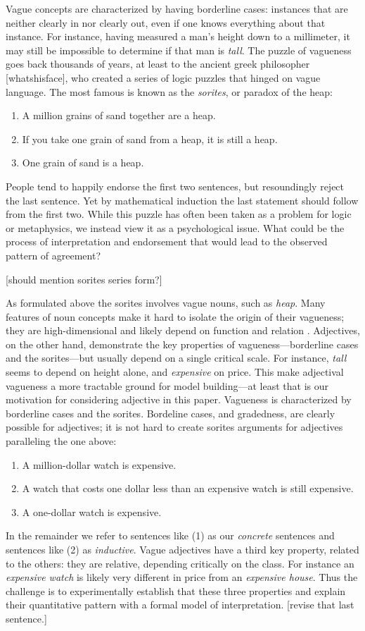 \documentclass[11pt]{amsart}
\newcommand{\ndg}[1]{{\color{ForestGreen}[#1]}}
\begin{document}
Vague concepts are characterized by having borderline cases: instances that are neither clearly in nor clearly out, even if one knows everything about that instance. 
For instance, having measured a man's height down to a millimeter, it may still be impossible to determine if that man is \emph{tall}.
The puzzle of vagueness goes back thousands of years, at least to the ancient greek philosopher \ndg{whatshisface}, who created a series of logic puzzles that hinged on vague language. 
The most famous is known as the \emph{sorites}, or paradox of the heap:
\begin{enumerate}
\item A million grains of sand together are a heap.
\item If you take one grain of sand from a heap, it is still a heap.
\item One grain of sand is a heap.
\end{enumerate}
People tend to happily endorse the first two sentences, but resoundingly reject the last sentence. Yet by mathematical induction the last statement should follow from the first two.
While this puzzle has often been taken as a problem for logic or metaphysics, we instead view it as a psychological issue. What could be the process of interpretation and endorsement that would lead to the observed pattern of agreement?

\ndg{should mention sorites series form?}

As formulated above the sorites involves vague nouns, such as \emph{heap}. 
Many features of noun concepts make it hard to isolate the origin of their vagueness; they are high-dimensional and likely depend on function and relation \cite{stuff}.
Adjectives, on the other hand, demonstrate the key properties of vagueness---borderline cases and the sorites---but usually depend on a single critical scale.
For instance, \emph{tall} seems to depend on height alone, and \emph{expensive} on price.
This make adjectival vagueness a more tractable ground for model building---at least that is our motivation for considering adjective in this paper.
Vagueness is characterized by borderline cases and the sorites.
Bordeline cases, and gradedness, are clearly possible for adjectives; it is not hard to create sorites arguments for adjectives paralleling the one above:
\begin{enumerate}
\item A million-dollar watch is expensive.
\item A watch that costs one dollar less than an expensive watch is still expensive.
\item A one-dollar watch is expensive.
\end{enumerate}
In the remainder we refer to sentences like (1) as our \emph{concrete} sentences and sentences like (2) as \emph{inductive}.
Vague adjectives have a third key property, related to the others: they are relative, depending critically on the class. 
For instance an \emph{expensive watch} is likely very different in price from an \emph{expensive house}.
Thus the challenge is to experimentally establish that these three properties and explain their quantitative pattern with a formal model of interpretation. \ndg{revise that last sentence.}
\end{document}
